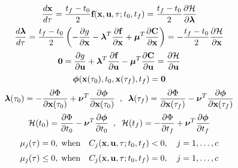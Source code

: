 \documentclass[10pt,final]{report}
\begin{document}
\begin{equation}\label{necc_cond}\begin{array}{c}
\displaystyle\frac{d \textbf{x}}{d\tau} =
\displaystyle\frac{t_f-t_0}{2}\textbf{f}(\textbf{x},\textbf{u},\tau;t_0,t_f)
= \frac{t_f-t_0}{2}\displaystyle\frac{\partial {\cal H}}{\partial
  \boldsymbol{\lambda}} \vspace{6pt}\\
\displaystyle\frac{d \boldsymbol{\lambda}}{d\tau} =
\displaystyle\frac{t_f-t_0}{2}\left(-\frac{\partial g}{\partial
    \textbf{x}} - \boldsymbol{\lambda}^T \frac{\partial
    \textbf{f}}{\partial \textbf{x}} + \boldsymbol{\mu}^T
\frac{\partial \textbf{C}}{\partial \textbf{x}}\right) =
-\displaystyle\frac{t_f-t_0}{2} \displaystyle\frac{\partial {\cal
    H}}{\partial \textbf{x}}
\vspace{6pt}\\
\textbf{0} = \displaystyle\frac{\partial g}{\partial \textbf{u}} +
\boldsymbol{\lambda}^T \frac{\partial \textbf{f}}{\partial \textbf{u}}
- \boldsymbol{\mu}^T  \frac{\partial \textbf{C}}{\partial
  \textbf{u}} = \displaystyle\frac{\partial {\cal H}}{\partial
  \textbf{u}} \vspace{6pt}\\
\boldsymbol{\phi}(\textbf{x}(\tau_0),t_0,\textbf{x}(\tau_f),t_f) =
\textbf{0} \vspace{6pt}\\
\boldsymbol{\lambda}(\tau_0) = -\displaystyle\frac{\partial
\Phi}{\partial \textbf{x}(\tau_0)} + \boldsymbol{\nu}^T
\displaystyle\frac{\partial \boldsymbol{\phi}}{\partial
  \textbf{x}(\tau_0)} \;\; , \;\;
\boldsymbol{\lambda}(\tau_f) = \displaystyle\frac{\partial
\Phi}{\partial \textbf{x}(\tau_f)} - \boldsymbol{\nu}^T
\displaystyle\frac{\partial \boldsymbol{\phi}}{\partial
\textbf{x}(\tau_f)} \vspace{6pt}\\
{\cal H}(t_0) = \displaystyle\frac{\partial \Phi}{\partial t_0} -
\boldsymbol{\nu}^T \frac{\partial \boldsymbol{\phi}}{\partial
t_0}  \; \; , \; \;
{\cal H}(t_f) = -\displaystyle\frac{\partial \Phi}{\partial t_f} +
\boldsymbol{\nu}^T \frac{\partial \boldsymbol{\phi}}{\partial
t_f}  \vspace{6pt}\\
 \mu_j(\tau)=0 , \; \mbox{when} \quad
 C_{j}(\textbf{x},\textbf{u},\tau;t_0,t_f)
 < 0 , \quad j = 1,\ldots,c \vspace{6pt}\\
 \mu_j(\tau)\leq0 , \; \mbox{when} \quad
 C_{j}(\textbf{x},\textbf{u},\tau;t_0,t_f)=0 , \quad j = 1,\ldots,c
\end{array}\end{equation}
\end{document}
